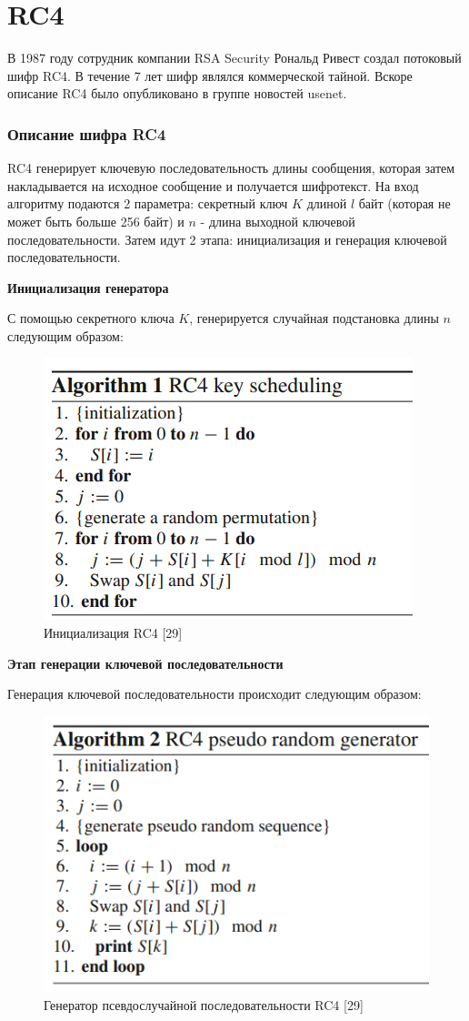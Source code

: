 \documentclass[colorthm]{./civarticle}
\begin{document}
\section{RC4}
В 1987 году сотрудник компании RSA Security Рональд Ривест создал потоковый шифр RC4. В течение 7 лет шифр являлся коммерческой тайной. Вскоре описание RC4 было опубликовано в группе новостей usenet.

\subsubsection{Описание шифра RC4}

RC4 генерирует ключевую последовательность длины сообщения, которая затем накладывается на исходное сообщение и получается шифротекст. На вход алгоритму подаются 2 параметра: секретный ключ $K$ длиной $l$ байт (которая не может быть больше 256 байт) и $n$ - длина выходной ключевой последовательности. Затем идут 2 этапа: инициализация и генерация ключевой последовательности.

\textbf{Инициализация генератора}

С помощью секретного ключа $K$, генерируется случайная подстановка длины $n$ следующим образом:

\begin{figure}[H]
    \centering
    \includegraphics[width=0.5\linewidth]{Снимок экрана 2024-01-12 162647.png}
    \caption{Инициализация RC4 [29]}
    \label{fig:enter-label}
\end{figure}

\textbf{Этап генерации ключевой последовательности}

Генерация ключевой последовательности происходит следующим образом:

\begin{figure}[H]
    \centering
    \includegraphics[width=0.5\linewidth]{Снимок экрана 2024-01-12 163228.png}
    \caption{Генератор псевдослучайной последовательности RC4 [29]}
    \label{fig:enter-label}
\end{figure}
\end{document}
